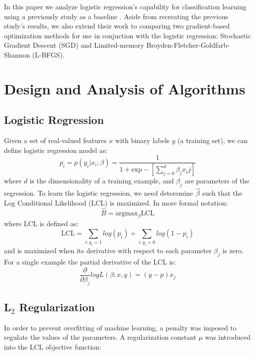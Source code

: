 \documentclass[10pt]{article}
\begin{document}
In this paper we analyze logistic regression's capability for classification learning using a previously study as a baseline \cite{t-logistic}. Aside from recreating the previous study's results, we also extend their work to comparing two gradient-based optimization methods for use in conjuction with the logistic regression: Stochastic Gradient Descent (SGD) and Limited-memory Broyden-Fletcher-Goldfarb-Shannon (L-BFGS).



\section{Design and Analysis of Algorithms}
\label{sec:algorithms}

\subsection{Logistic Regression}
Given a set of real-valued features $x$ with binary labels $y$ (a training set), we can define logistic regression model as: 
\begin{equation}
    p_i = p( y_i | x_i ; \beta )  = \frac{1}{1 + \textrm{exp}-[\sum_{j=0}^d \beta_j x_ij]}
\end{equation}
where $d$ is the dimensionality of a training example, and $\beta_j$ are parameters of the regression. To learn the logistic regression, we need deteremine $\vec\beta$ such that the Log Conditional Likelihood (LCL) is maximized. In more formal notation:
\begin{equation}
   \widehat{B} = \textrm{argmax}_{\beta} \textrm{LCL}
\end{equation}
where LCL is defined as:
\begin{equation}
    \textrm{LCL} = \sum_{i:y_i=1} log (p_i) + \sum_{i:y_i=0} log (1-p_i)
\end{equation}
and is maximized when its derivative with respect to each parameter $\beta_j$ is zero. For a single example the partial derivative of the LCL is:
\begin{equation}
    \frac{\partial}{\partial \beta_j} log L(\beta ; x, y) = (y - p) x_j
\end{equation}


\subsection{L$_2$ Regularization}
In order to prevent overfitting of machine learning, a penalty was imposed to regulate the values of the parameters. A regularization constant $\mu$ was introduced into the LCL objective function:
\end{document}

